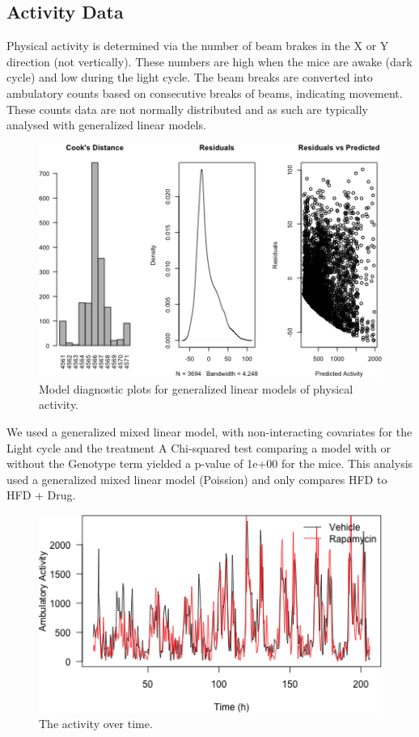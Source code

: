 \documentclass[]{article}
\begin{document}
\subsection{Activity Data}\label{activity-data}

Physical activity is determined via the number of beam brakes in the X
or Y direction (not vertically). These numbers are high when the mice
are awake (dark cycle) and low during the light cycle. The beam breaks
are converted into ambulatory counts based on consecutive breaks of
beams, indicating movement. These counts data are not normally
distributed and as such are typically analysed with generalized linear
models.

\begin{figure}[htbp]
\centering
\includegraphics{figures/activity-statistics-1.png}
\caption{Model diagnostic plots for generalized linear models of
physical activity.}
\end{figure}

We used a generalized mixed linear model, with non-interacting
covariates for the Light cycle and the treatment A Chi-squared test
comparing a model with or without the Genotype term yielded a p-value of
1e+00 for the mice. This analysis used a generalized mixed linear model
(Poission) and only compares HFD to HFD + Drug.

\begin{figure}[htbp]
\centering
\includegraphics{figures/activity-time-course-1.png}
\caption{The activity over time.}
\end{figure}
\end{document}
